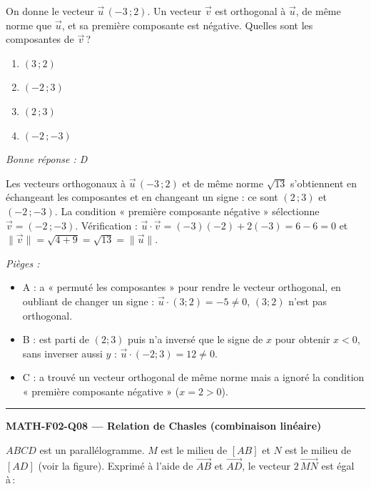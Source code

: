 \documentclass[11pt,a4paper]{article}
\newcommand{\vv}[1]{\vec{#1}}
\begin{document}
On donne le vecteur $\vv{u}\,(-3\,;2)$. Un vecteur $\vv{v}$ est orthogonal à $\vv{u}$, de même norme que $\vv{u}$, et sa première composante est négative. Quelles sont les composantes de $\vv{v}$\,?
\begin{enumerate}[label=\Alph*)]
\item $(3\,;2)$
\item $(-2\,;3)$
\item $(2\,;3)$
\item $(-2\,;-3)$
\end{enumerate}
\textit{Bonne réponse : D}\par
Les vecteurs orthogonaux à $\vv{u}\,(-3\,;2)$ et de même norme $\sqrt{13}$ s'obtiennent en échangeant les composantes et en changeant un signe : ce sont $(2\,;3)$ et $(-2\,;-3)$. La condition « première composante négative » sélectionne $\vv{v}=(-2\,;-3)$. Vérification : $\vv{u}\cdot\vv{v}=(-3)(-2)+2(-3)=6-6=0$ et $\|\vv{v}\|=\sqrt{4+9}=\sqrt{13}=\|\vv{u}\|$.\par
\textit{Pièges :}
\begin{itemize}
\item A : a « permuté les composantes » pour rendre le vecteur orthogonal, en oubliant de changer un signe : $\vv{u}\cdot(3;2)=-5\neq 0$, $(3;2)$ n'est pas orthogonal.
\item B : est parti de $(2;3)$ puis n'a inversé que le signe de $x$ pour obtenir $x<0$, sans inverser aussi $y$ : $\vv{u}\cdot(-2;3)=12\neq 0$.
\item C : a trouvé un vecteur orthogonal de même norme mais a ignoré la condition « première composante négative » ($x=2>0$).
\end{itemize}
\vspace{8pt}\hrule\vspace{8pt}
\noindent\textbf{MATH-F02-Q08 --- Relation de Chasles (combinaison linéaire)}\par
$ABCD$ est un parallélogramme. $M$ est le milieu de $[AB]$ et $N$ est le milieu de $[AD]$ (voir la figure). Exprimé à l'aide de $\vv{AB}$ et $\vv{AD}$, le vecteur $2\,\vv{MN}$ est égal à\,:
\begin{center}
\end{center}
\end{document}

